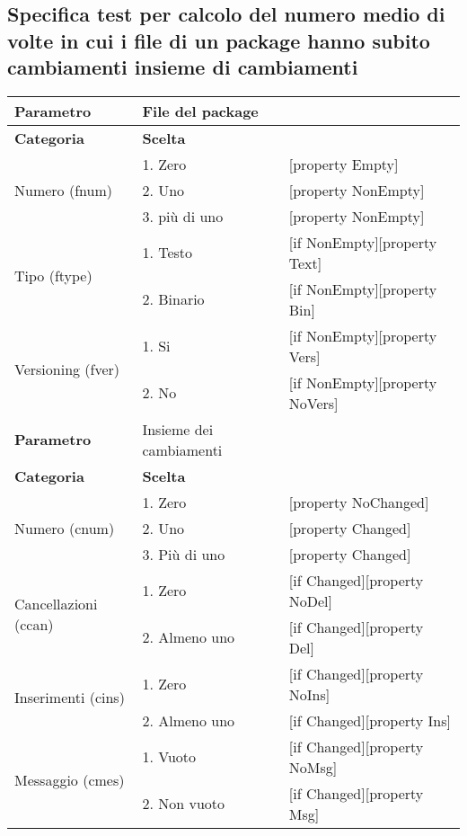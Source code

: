 \clearpage
		
\subsection{Specifica test per calcolo del numero medio di volte in cui i file di un package hanno subito cambiamenti insieme di cambiamenti}	
	
		\begin{table}[ht]
		\footnotesize
		\centering
			\begin{tabular}{|p{4cm}|p{4cm}p{5cm}|}
				\hline
				\cellcolor{Gray} \textbf{Parametro}		& File del package	&											\tabularnewline
				\hline
				\rowcolor{Gray}
				\textbf{Categoria} 						& \textbf{Scelta}			&									\tabularnewline
				\hline
				\multirow{3}{*}{Numero (fnum)} 			& 1. Zero 					&	[property Empty] 				\tabularnewline
				\cline{2-3}
														& 2. Uno 					&	[property NonEmpty]				\tabularnewline
				\cline{2-3}
														& 3. più di uno 			&	[property NonEmpty]				\tabularnewline
				\hline
				\multirow{2}{*}{Tipo (ftype)} 			& 1. Testo					&	[if NonEmpty][property Text] 	\tabularnewline
				\cline{2-3}
														& 2. Binario				&	[if NonEmpty][property Bin]		\tabularnewline
				\hline
				\multirow{2}{*}{Versioning (fver)}		& 1. Si						&	[if NonEmpty][property Vers]	\tabularnewline
				\cline{2-3}
														& 2. No						&	[if NonEmpty][property NoVers]	\tabularnewline
				\hline
				
				
				\cellcolor{Gray} \textbf{Parametro}		& Insieme dei cambiamenti	&									\tabularnewline
				\hline
				\rowcolor{Gray}
				\textbf{Categoria} 						& \textbf{Scelta}			&									\tabularnewline
				\hline
				\multirow{3}{*}{Numero (cnum)} 			& 1. Zero 					&	[property NoChanged]			\tabularnewline
				\cline{2-3}
														& 2. Uno					&	[property Changed]				\tabularnewline
				\cline{2-3}
														& 3. Più di uno				&	[property Changed]				\tabularnewline
				\hline
				\multirow{2}{*}{Cancellazioni (ccan)} 	& 1. Zero	 				&	[if Changed][property NoDel] 	\tabularnewline
				\cline{2-3}
														& 2. Almeno uno				&	[if Changed][property Del]		\tabularnewline
				\hline
				\multirow{2}{*}{Inserimenti (cins)} 	& 1. Zero 					&	[if Changed][property NoIns] 	\tabularnewline
				\cline{2-3}
														& 2. Almeno uno 			&	[if Changed][property Ins]		\tabularnewline
				\hline
				\multirow{2}{*}{Messaggio (cmes)} 		& 1. Vuoto 					&	[if Changed][property NoMsg] 	\tabularnewline
				\cline{2-3}
														& 2. Non vuoto 				&	[if Changed][property Msg]		\tabularnewline
				\hline			
				
			\end{tabular}
		\end {table}

